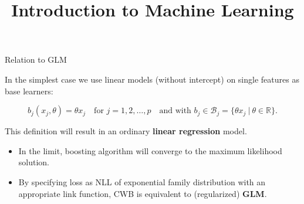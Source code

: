 \documentclass[11pt,compress,t,notes=noshow, xcolor=table]{beamer}
\title{Introduction to Machine Learning}
\begin{document}

\begin{vbframe}{Relation to GLM}

In the simplest case we use linear models (without intercept) on single features
as base learners:

$$
  b_j(x_j,\theta) = \theta x_j  \quad \text{for } j = 1, 2, \dots, p \quad
  \text{and with } b_j \in \mathcal{B}_j = \{\theta x_j  ~\rvert~ \theta \in
  \mathbb{R} \}.
$$


This definition will result in an ordinary \textbf{linear regression} model.

\lz


\begin{itemize} 
\setlength{\itemsep}{1.6em}
  \item In the limit, boosting algorithm will converge to the maximum likelihood solution.
  \item By specifying loss as NLL of exponential family distribution with an appropriate link function, CWB is equivalent to (regularized) \textbf{GLM}.
\end{itemize}

\framebreak



\end{vbframe}
\end{document}
